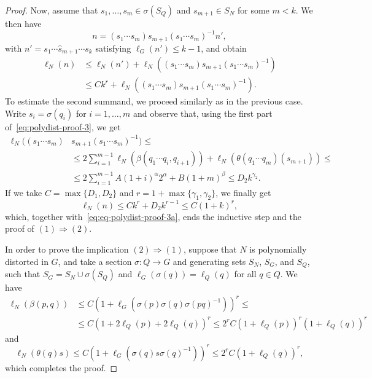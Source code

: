 \documentclass{amsart}
\theoremstyle{definition}
\theoremstyle{remark}
\begin{document}
\begin{proof}
  Now, assume that $s_1,\dots,s_m \in \sigma(S_Q)$ and $s_{m+1}\in
  S_N$ for some $m<k$. We then have
  \begin{equation}
    \label{eq:polydist-proof-1}
    n=(s_1\cdots s_m)s_{m+1}(s_1\cdots s_m)^{-1}n',
  \end{equation}
  with $n' = s_1\cdots \hat{s}_{m+1}\cdots s_k$ satisfying $\ell_G(n')\leq k-1$, and obtain
  \begin{equation}
    \begin{split}
      \label{eq:polydist-proof-2}
      \ell_N(n) & \leq \ell_N(n') + \ell_N((s_1\cdots
      s_m)s_{m+1}(s_1\cdots s_m)^{-1}) \\
      & \leq Ck^r + \ell_N((s_1\cdots s_m)s_{m+1}(s_1\cdots
      s_m)^{-1}).
    \end{split}
  \end{equation}
  To estimate the second summand, we proceed similarly as in the previous
  case. Write $s_i=\sigma(q_i)$ for $i=1,\dots,m$ and observe that,
  using the first part of~\eqref{eq:polydist-proof-3}, we get
  \begin{equation}
    \label{eq:polydist-proof-4}
    \begin{split}
      \ell_N((s_1\cdots s_m)&s_{m+1}(s_1\cdots s_m)^{-1}) \leq\\
      &\leq2\sum_{i=1}^{m-1}\ell_N(\beta(q_1\cdots q_i,q_{i+1})) +
      \ell_N(\theta(q_1\cdots q_m)(s_{m+1}))\leq\\
      &\leq 2\sum_{i=1}^{m-1} A(1+i)^\alpha 2^\alpha +
      B(1+m)^\beta\leq D_2k^{\gamma_2}. 
    \end{split}
  \end{equation}
  If we take $C=\max\{D_1,D_2\}$ and $r=1+\max\{\gamma_1,\gamma_2\}$, we finally get
  \begin{equation}
    \label{eq:polydist-proof-5}
    \ell_N(n)\leq Ck^r+D_2k^{r-1} \leq C(1+k)^r,
  \end{equation}
  which, together with~\eqref{eq:eq-polydist-proof-3a}, ends the inductive step and the proof of $(1){\Rightarrow} (2)$.

  In order to prove the implication $(2){\Rightarrow} (1)$, suppose that $N$
  is polynomially distorted in $G$, and take a section $\sigma\colon
  Q\to G$ and generating sets $S_N$, $S_G$, and $S_Q$, such that
  $S_G=S_N\cup \sigma(S_Q)$ and $\ell_G(\sigma(q))=\ell_Q(q)$ for all
  $q\in Q$. We have
  \begin{equation}
    \label{eq:polydist-proof-6}
    \begin{split}
      \ell_N(\beta(p,q)) & \leq
      C(1+\ell_G(\sigma(p)\sigma(q)\sigma(pq)^{-1}))^r \leq \\ 
      & \leq C(1 + 2\ell_Q(p)+2\ell_Q(q))^r \leq
      2^rC(1+\ell_Q(p))^r(1+\ell_Q(q))^r
    \end{split}
  \end{equation}
  and
  \begin{equation}
    \label{eq:polydist-proof-7}
    \ell_N(\theta(q)s)\leq C(1+\ell_G(\sigma(q)s\sigma(q)^{-1}))^r \leq 2^rC(1+\ell_Q(q))^r,
  \end{equation}
  which completes the proof.
\end{proof}
\end{document}
